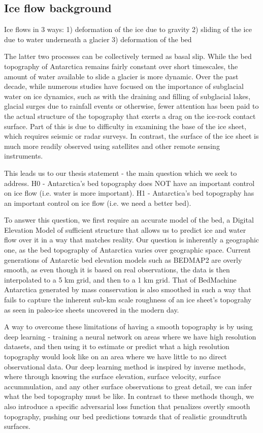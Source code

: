 \subsection{Ice flow background}

Ice flows in 3 ways:
1) deformation of the ice due to gravity
2) sliding of the ice due to water underneath a glacier
3) deformation of the bed

The latter two processes can be collectively termed as basal slip.
While the bed topography of Antarctica remains fairly constant over short timescales, the amount of water available to slide a glacier is more dynamic.
Over the past decade, while numerous studies have focused on the importance of subglacial water on ice dynamics, such as with the draining and filling of subglacial lakes, glacial surges due to rainfall events or otherwise, fewer attention has been paid to the actual structure of the topography that exerts a drag on the ice-rock contact surface.
Part of this is due to difficulty in examining the base of the ice sheet, which requires seismic or radar surveys.
In contrast, the surface of the ice sheet is much more readily observed using satellites and other remote sensing instruments.

This leads us to our thesis statement - the main question which we seek to address.
H0 - Antarctica's bed topography does NOT have an important control on ice flow (i.e. water is more important).
H1 - Antarctica's bed topography has an important control on ice flow (i.e. we need a better bed).

To answer this question, we first require an accurate model of the bed, a Digital Elevation Model of sufficient structure that allows us to predict ice and water flow over it in a way that matches reality.
Our question is inherently a geographic one, as the bed topography of Antarctica varies over geographic space.
Current generations of Antarctic bed elevation models such as BEDMAP2 are overly smooth, as even though it is based on real observations, the data is then interpolated to a 5 km grid, and then to a 1 km grid.
That of BedMachine Antarctica generated by mass conservation is also smoothed in such a way that fails to capture the inherent sub-km scale roughness of an ice sheet's topograhy as seen in paleo-ice sheets uncovered in the modern day.

A way to overcome these limitations of having a smooth topography is by using deep learning - training a neural network on areas where we have high resolution datasets, and then using it to estimate or predict what a high resolution topography would look like on an area where we have little to no direct observational data.
Our deep learning method is inspired by inverse methods, where through knowing the surface elevation, surface velocity, surface accummulation, and any other surface observations to great detail, we can infer what the bed topography must be like.
In contrast to these methods though, we also introduce a specific adversarial loss function that penalizes overtly smooth topography, pushing our bed predictions towards that of realistic groundtruth surfaces.

